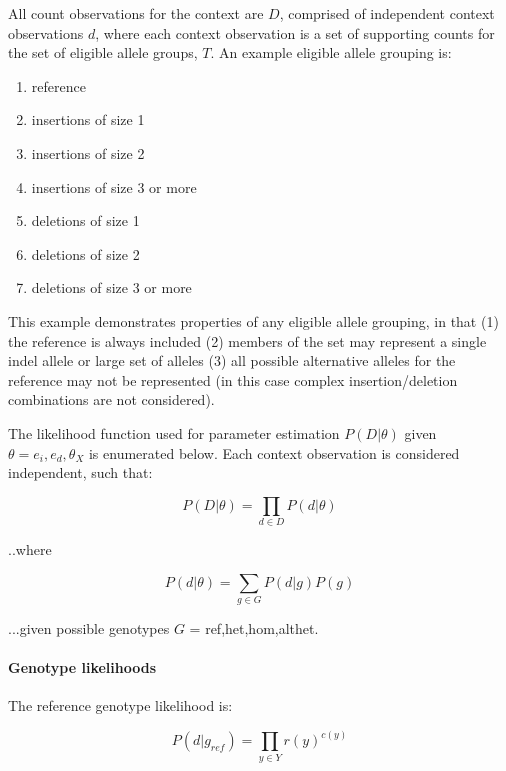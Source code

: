 \documentclass{article}
\begin{document}
All count observations for the context are $D$, comprised of independent context observations $d$, where each context observation is a set of supporting counts for the set of eligible allele groups, $T$. An example eligible allele grouping is:

\begin{enumerate}
\item reference
\item insertions of size 1
\item insertions of size 2
\item insertions of size 3 or more
\item deletions of size 1
\item deletions of size 2
\item deletions of size 3 or more
\end{enumerate}

This example demonstrates properties of any eligible allele grouping, in that (1) the reference is always included (2) members of the set may represent a single indel allele or large set of alleles (3) all possible alternative alleles for the reference may not be represented (in this case complex insertion/deletion combinations are not considered).

The likelihood function used for parameter estimation $P( D \vert \theta )$ given $\theta = {e_i,e_d,\theta_X}$ is enumerated below. Each context observation is considered independent, such that:

\begin{equation}
\label{eq:m2}
P(D \vert \theta) = \prod_{d \in D} P(d \vert \theta)
\end{equation}

..where

\begin{equation*}
P(d \vert \theta) = \sum_{g \in G} P(d \vert g) P(g)
\end{equation*}

...given possible genotypes $G$ = {ref,het,hom,althet}.

\paragraph{Genotype likelihoods}

The reference genotype likelihood is:

\begin{equation*}
P ( d \vert g_{ref} ) = \prod_{y \in Y} r(y)^{c(y)}
\end{equation*}
\end{document}

